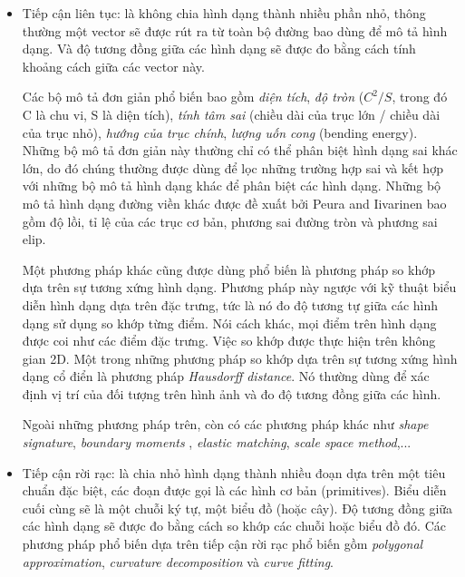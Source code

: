 \begin{itemize}

\item Tiếp cận liên tục: là không chia hình dạng thành nhiều phần nhỏ, thông thường một vector sẽ được rút ra từ toàn bộ đường bao dùng để mô tả hình dạng. Và độ tương đồng giữa các hình dạng sẽ được đo bằng cách tính khoảng cách giữa các vector này.

Các bộ mô tả đơn giản phổ biến bao gồm \textit{diện tích}, \textit{độ tròn} ($C^2/S$, trong đó C là chu vi, S là diện tích), \textit{tính tâm sai} (chiều dài của trục lớn / chiều dài của trục nhỏ), \textit{hướng của trục chính}, \textit{lượng uốn cong} (bending energy)\cite{young1974analysis}. Những bộ mô tả đơn giản này thường chỉ có thể phân biệt hình dạng sai khác lớn, do đó chúng thường được dùng để lọc những trường hợp sai và kết hợp với những bộ mô tả hình dạng khác để phân biệt các hình dạng. Những bộ mô tả hình dạng đường viền khác được đề xuất bởi Peura and Iivarinen\cite{peura1997efficiency} bao gồm độ lồi, tỉ lệ của các trục cơ bản, phương sai đường tròn và phương sai elip.

Một phương pháp khác cũng được dùng phổ biến là phương pháp so khớp dựa trên sự tương xứng hình dạng. Phương pháp này ngược với kỹ thuật biểu diễn hình dạng dựa trên đặc trưng, tức là nó đo độ tương tự giữa các hình dạng sử dụng so khớp từng điểm. Nói cách khác, mọi điểm trên hình dạng được coi như các điểm đặc trưng. Việc so khớp được thực hiện trên không gian 2D. Một trong những phương pháp so khớp dựa trên sự tương xứng hình dạng cổ điển là phương pháp \textit{Hausdorff distance}\cite{chetverikov1999matching}. Nó thường dùng để xác định vị trí của đối tượng trên hình ảnh và đo độ tương đồng giữa các hình.

Ngoài những phương pháp trên, còn có các phương pháp khác như \textit{shape signature}\cite{davies2004machine, van1991contour, zhang2002comparative}, \textit{boundary moments}\cite{sonka2014image, gonzalez2002digital} , \textit{elastic matching}\cite{del1997visual}, \textit{scale space method}\cite{asada1986curvature},...

\item Tiếp cận rời rạc: là chia nhỏ hình dạng thành nhiều đoạn dựa trên một tiêu chuẩn đặc biệt, các đoạn được gọi là các hình cơ bản (primitives). Biểu diễn cuối cùng sẽ là một chuỗi ký tự, một biểu đồ (hoặc cây). Độ tương đồng giữa các hình dạng sẽ được đo bằng cách so khớp các chuỗi hoặc biểu đồ đó. Các phương pháp phổ biến dựa trên tiếp cận rời rạc phổ biến gồm \textit{polygonal approximation}, \textit{curvature decomposition} và \textit{curve fitting}\cite{pavlidis1982algorithms}.
\end{itemize}
